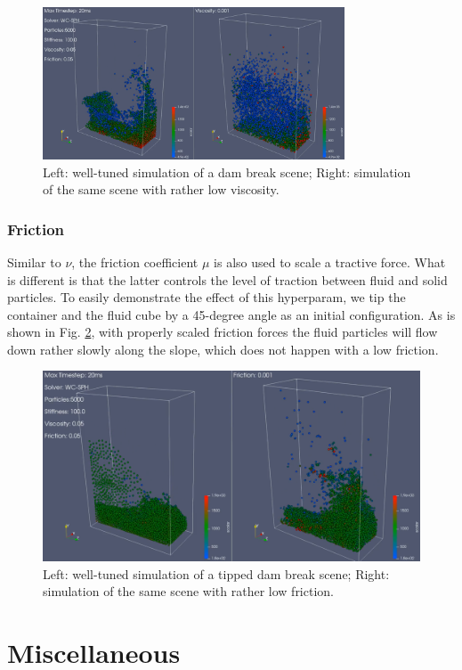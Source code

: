 \documentclass[
	11pt, 
	DIV10,
	ngerman,
	a4paper, 
	oneside, 
	headings=normal, 
	captions=tableheading,
	final, 
	numbers=noenddot
]{scrartcl}
\begin{document}
\begin{figure}
    \centering
    \includegraphics[width=0.8\textwidth]{pics/wcsph_viscosity.png}
    \caption{Left: well-tuned simulation of a dam break scene; Right: simulation of the same scene with rather low viscosity.}
    \label{fig:visco}
\end{figure}

\subsubsection{Friction}
Similar to $ \nu $, the friction coefficient $ \mu $ is also used to scale a tractive force. What is different is that the latter controls the level of traction between fluid and solid particles. To easily demonstrate the effect of this hyperparam, we tip the container and the fluid cube by a 45-degree angle as an initial configuration. As is shown in Fig. \ref{fig:frict}, with properly scaled friction forces the fluid particles will flow down rather slowly along the slope, which does not happen with a low friction.

\begin{figure}
    \centering
    \includegraphics[width=.8\textwidth]{pics/wcsph_friction.png}
    \caption{Left: well-tuned simulation of a tipped dam break scene; Right: simulation of the same scene with rather low friction.}
    \label{fig:frict}
\end{figure}

\section{Miscellaneous}
\label{sec5}



\end{document}
